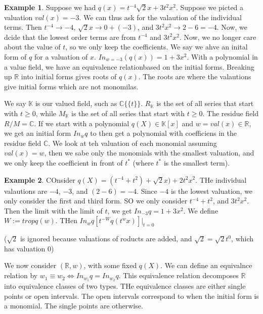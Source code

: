 \documentclass[11pt]{article}
\theoremstyle{definition}
\newtheorem{protoexample}{Example}[section]
\newenvironment{ex}
   {\begin{protoexample}}
   {\end{protoexample}}
\def\RR{{\mathbb R}}
\def\KK{{\mathbb K}}
\def\CC{{\mathbb C}}
\begin{document}
\begin{ex}
    Suppose we had $q(x) = t^{-4} \sqrt{2} x + 3t^2x^2$. Suppose we picted a valuation $val(x) = -3$. We can thus ask for the valaution of the individual terms. Then $t^{-4} \rightarrow -4$, $\sqrt{2}x \rightarrow 0+(-3)$, and $3t^2 x^2 \rightarrow 2-6= -4$. Now, we dcide that the lowest order terms are from $t^{-4}$ and $3t^2x^2$. Now, we no longer care about the value of $t$, so we only keep the coefficients. We say we ahve an inital form of $q$ for a valuation of $x$. $In_{w = -3} (q(x)) = 1+ 3x^2$. With a polynomial in a value field, we have an equivalence relationbased on the initial forms. Breaking up $\RR$ into initial forms gives roots of $q(x)$. The roots are where the valautions give initial forms which are not monomilas.
\end{ex}


We say $\KK$ is our valued field, such as $\CC\{\{t\}\}$. $R_\KK$ is the set of all series that start with $t \geq 0$, while $M_\KK$ is the set of all series that start with $t \geq 0$. The residue field $R/M = \CC$. If we start with a polynomial $q(X) \in \KK[x]$ and $w= val(x) \in \RR$, we get an initial form $In_w q$ to then get a polynomial with coefficiens in the residue field $\CC$. We look at teh valuation of each monomial assuming $val(x)=w$, then we sabe only the monomials with the smallest valuation, and we only keep the coefficient in front of $t^*$ (where $t^*$ is the smallest term).

\begin{ex}
    COnsider $q(X) = (t^{-4} + t^2) + \sqrt{2} x) + 2t^2x^2 $. THe individual valautions are $-4$, $-3$, and $(2-6)=-4$. Since $-4$ is the lowest valuation, we only consider the first and third form. SO we only consider $t^{-4}+t^2$, and $3t^2x^2$. Then the limit with the limit of $t$,  we get $In_{-3} q = 1 + 3x^2$. We define $W:=trop q(w)$. THen $In_w q [t^{-W} q(t^wx)] |_{t=0}$
\end{ex}


($\sqrt{2}$ is ignored because valuations of roducts are added, and $\sqrt{2}=\sqrt{2}t^0$, which has valuation $0$)


We now consider $(\RR,w)$, with some fixed $q(X)$. We can define an equivalnce relation by $w_1 \equiv w_2 \iff In_{w_1}q = In_{w_2}q$. This equivalence relation decomposes $\RR$ into equivalence classes of two types. THe equivalence classes are either single points or open intervals. The open intervals correspond to when the initial form is a monomial. The single points are otherwise.
\end{document}
